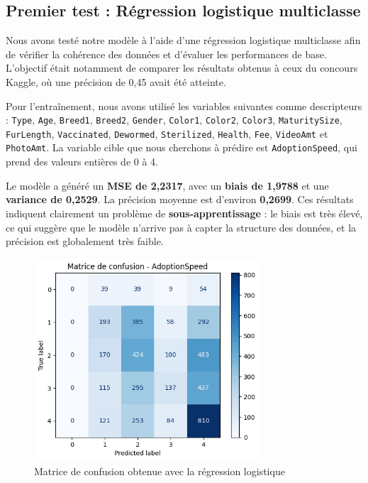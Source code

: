 \documentclass[a4paper,12pt]{article}
\begin{document}
\subsection{Premier test : Régression logistique multiclasse}

Nous avons testé notre modèle à l’aide d’une régression logistique multiclasse afin de vérifier la cohérence des données et d’évaluer les performances de base. L’objectif était notamment de comparer les résultats obtenus à ceux du concours Kaggle, où une précision de 0{,}45 avait été atteinte.

Pour l’entraînement, nous avons utilisé les variables suivantes comme descripteurs : \texttt{Type}, \texttt{Age}, \texttt{Breed1}, \texttt{Breed2}, \texttt{Gender}, \texttt{Color1}, \texttt{Color2}, \texttt{Color3}, \texttt{MaturitySize}, \texttt{FurLength}, \texttt{Vaccinated}, \texttt{Dewormed}, \texttt{Sterilized}, \texttt{Health}, \texttt{Fee}, \texttt{VideoAmt} et \texttt{PhotoAmt}. La variable cible que nous cherchons à prédire est \texttt{AdoptionSpeed}, qui prend des valeurs entières de 0 à 4.

Le modèle a généré un \textbf{MSE de 2{,}2317}, avec un \textbf{biais de 1{,}9788} et une \textbf{variance de 0{,}2529}. La précision moyenne est d’environ \textbf{0{,}2699}. Ces résultats indiquent clairement un problème de \textbf{sous-apprentissage} : le biais est très élevé, ce qui suggère que le modèle n’arrive pas à capter la structure des données, et la précision est globalement très faible.

\begin{figure}[H]
    \centering
    \includegraphics[width=0.75\textwidth]{matrice_confusion_logreg.png}
    \caption{Matrice de confusion obtenue avec la régression logistique}
    \label{fig:confusion_logreg}
\end{figure}
\end{document}
